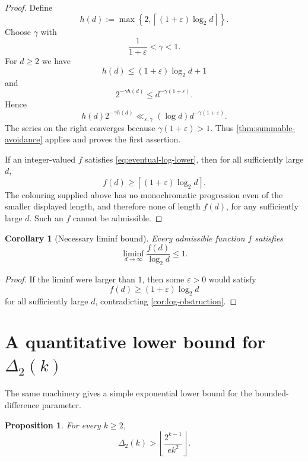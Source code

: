 \documentclass[11pt]{article}
\newtheorem{proposition}[theorem]{Proposition}
\newtheorem{corollary}[theorem]{Corollary}
\theoremstyle{definition}
\theoremstyle{remark}
\newcommand{\DeltaTwo}{\Delta_{2}}
\begin{document}
\begin{proof}
Define
\[
h(d):=\max\left\{2,\left\lceil(1+\varepsilon)\log_2d\right\rceil\right\}.
\]
Choose $\gamma$ with
\[
\frac1{1+\varepsilon}<\gamma<1.
\]
For $d\ge2$ we have
\[
h(d)\le (1+\varepsilon)\log_2d+1
\]
and
\[
2^{-\gamma h(d)}\le d^{-\gamma(1+\varepsilon)}.
\]
Hence
\[
h(d)2^{-\gamma h(d)}
\ll_{\varepsilon,\gamma}
(\log d)d^{-\gamma(1+\varepsilon)}.
\]
The series on the right converges because $\gamma(1+\varepsilon)>1$. Thus \cref{thm:summable-avoidance} applies and proves the first assertion.

If an integer-valued $f$ satisfies \eqref{eq:eventual-log-lower}, then for all sufficiently large $d$,
\[
f(d)\ge\left\lceil(1+\varepsilon)\log_2d\right\rceil.
\]
The colouring supplied above has no monochromatic progression even of the smaller displayed length, and therefore none of length $f(d)$, for any sufficiently large $d$. Such an $f$ cannot be admissible.
\end{proof}

\begin{corollary}[Necessary liminf bound]\label{cor:liminf}
Every admissible function $f$ satisfies
\[
\liminf_{d\to\infty}\frac{f(d)}{\log_2d}\le1.
\]
\end{corollary}

\begin{proof}
If the liminf were larger than $1$, then some $\varepsilon>0$ would satisfy
\[
f(d)\ge(1+\varepsilon)\log_2d
\]
for all sufficiently large $d$, contradicting \cref{cor:log-obstruction}.
\end{proof}

\section{A quantitative lower bound for \texorpdfstring{$\DeltaTwo(k)$}{Delta2(k)}}

The same machinery gives a simple exponential lower bound for the bounded-difference parameter.

\begin{proposition}\label{prop:delta-lower}
For every $k\ge2$,
\begin{equation}\label{eq:delta-lower}
\DeltaTwo(k)>
\left\lfloor\frac{2^{k-1}}{e k^2}\right\rfloor.
\end{equation}
\end{proposition}
\end{document}
